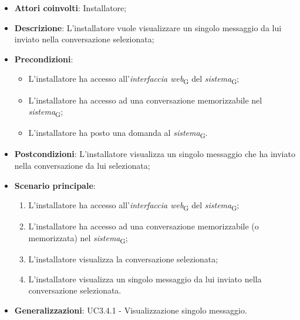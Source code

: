 \begin{itemize}
    \item \textbf{Attori coinvolti}: Installatore;
    \item \textbf{Descrizione}: L'installatore vuole visualizzare un singolo messaggio da lui inviato nella conversazione selezionata;
    \item \textbf{Precondizioni}: 
    \begin{itemize}
        \item L’installatore ha accesso all’\textit{interfaccia web}\textsubscript{G} del \textit{sistema}\textsubscript{G};
        \item L’installatore ha accesso ad una conversazione memorizzabile nel \textit{sistema}\textsubscript{G};
        \item L'installatore ha posto una domanda al \textit{sistema}\textsubscript{G}.
    \end{itemize}
    \item \textbf{Postcondizioni}: L'installatore visualizza un singolo messaggio che ha inviato nella conversazione da lui selezionata;
    \item \textbf{Scenario principale}:
    \begin{enumerate}
        \item L’installatore ha accesso all’\textit{interfaccia web}\textsubscript{G} del \textit{sistema}\textsubscript{G};
        \item L’installatore ha accesso ad una conversazione memorizzabile (o memorizzata) nel \textit{sistema}\textsubscript{G};
        \item L'installatore visualizza la conversazione selezionata;
        \item L'installatore visualizza un singolo messaggio da lui inviato nella conversazione selezionata.
    \end{enumerate}
    \item \textbf{Generalizzazioni}: UC3.4.1 - Visualizzazione singolo messaggio.
\end{itemize}


